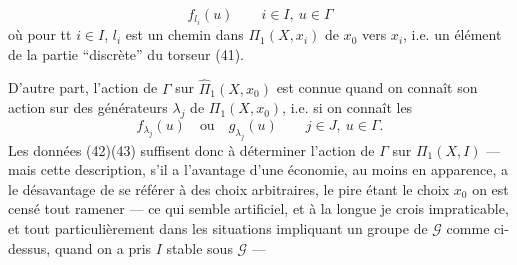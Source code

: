\[
\tag{41}f_{l_i}(u)\qquad i\in I,\ u\in\Gamma
\]
où pour tt $i\in I$, $l_i$ est un chemin dans $\Pi_1(X,x_i)$ de $x_0$ vers $x_i$, i.e. un élément de la partie ``discrète'' du torseur (41).

D'autre part, l'action de $\Gamma$ sur $\widehat\Pi_1(X,x_0)$ est connue quand on connaît son action sur des générateurs $\lambda_j$  de $\Pi_1(X,x_0)$, i.e. si on connaît les
\[
\tag{43}f_{\lambda_j}(u)\quad\text{ou}\quad g_{\lambda_j}(u)\qquad j\in J,\ u\in\Gamma.
\]
 Les données (42)(43) suffisent donc à déterminer l'action de $\Gamma$ sur $\Pi_1(X,I)$ --- mais cette description,   s'il a l'avantage d'une économie, au moins en apparence, a le désavantage de se référer à des choix arbitraires, le pire étant le choix    $x_0$   on est censé tout ramener --- ce qui semble artificiel, et à la longue je crois impraticable,  et tout particulièrement dans les situations impliquant un groupe de  $\mathcal G$ comme ci-dessus, quand on a pris $I$ stable sous $\mathcal G$ ---
